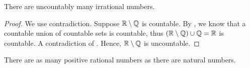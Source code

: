 \documentclass[11pt,twoside=off,numbers=noenddot]{scrbook}
\begin{document}
\begin{theorem}
    There are uncountably many irrational numbers.
\end{theorem}

\begin{proof}
    We use contradiction. Suppose $\mathbb R \setminus \mathbb Q$ is countable. By , we know that a countable union of countable sets is countable, thus $(\mathbb R \setminus \mathbb Q) \cup \mathbb Q = \mathbb R$ is countable. A contradiction of . Hence, $\mathbb R \setminus \mathbb Q$ is uncountable.
\end{proof}

\begin{theorem}[$\size{\QQ_+} = \size{\NN}$]
    There are as many positive rational numbers as there are natural numbers.
\end{theorem}
\end{document}
